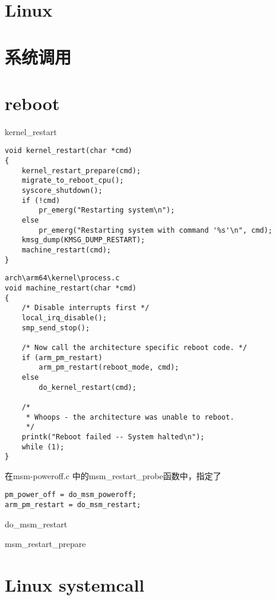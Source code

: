 \chapter{Linux}




\chapter{系统调用}








\chapter{reboot}


kernel\_restart


\begin{lstlisting}
void kernel_restart(char *cmd)
{
	kernel_restart_prepare(cmd);
	migrate_to_reboot_cpu();
	syscore_shutdown();
	if (!cmd)
		pr_emerg("Restarting system\n");
	else
		pr_emerg("Restarting system with command '%s'\n", cmd);
	kmsg_dump(KMSG_DUMP_RESTART);
	machine_restart(cmd);
}
\end{lstlisting}


\begin{lstlisting}
arch\arm64\kernel\process.c
void machine_restart(char *cmd)
{
	/* Disable interrupts first */
	local_irq_disable();
	smp_send_stop();

	/* Now call the architecture specific reboot code. */
	if (arm_pm_restart)
		arm_pm_restart(reboot_mode, cmd);
	else
		do_kernel_restart(cmd);

	/*
	 * Whoops - the architecture was unable to reboot.
	 */
	printk("Reboot failed -- System halted\n");
	while (1);
} 

\end{lstlisting}

在msm-poweroff.c 中的msm\_restart\_probe函数中，指定了

\begin{lstlisting}
pm_power_off = do_msm_poweroff;
arm_pm_restart = do_msm_restart;
\end{lstlisting}


do\_msm\_restart

msm\_restart\_prepare




\chapter{Linux systemcall }

